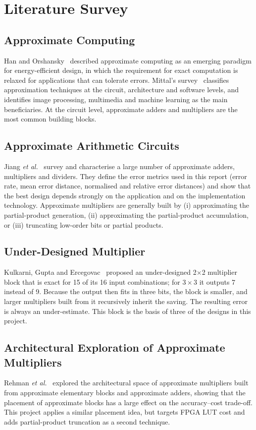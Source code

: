 \documentclass[12pt,a4paper,oneside]{report}
\begin{document}
\chapter{Literature Survey}

\section{Approximate Computing}
Han and Orshansky~\cite{han2013approximate} described approximate computing as an emerging paradigm for energy-efficient design, in which the requirement for exact computation is relaxed for applications that can tolerate errors. Mittal's survey~\cite{mittal2016survey} classifies approximation techniques at the circuit, architecture and software levels, and identifies image processing, multimedia and machine learning as the main beneficiaries. At the circuit level, approximate adders and multipliers are the most common building blocks.

\section{Approximate Arithmetic Circuits}
Jiang \emph{et al.}~\cite{jiang2020survey} survey and characterise a large number of approximate adders, multipliers and dividers. They define the error metrics used in this report (error rate, mean error distance, normalised and relative error distances) and show that the best design depends strongly on the application and on the implementation technology. Approximate multipliers are generally built by (i) approximating the partial-product generation, (ii) approximating the partial-product accumulation, or (iii) truncating low-order bits or partial products.

\section{Under-Designed Multiplier}
Kulkarni, Gupta and Ercegovac~\cite{kulkarni2011udm} proposed an under-designed 2$\times$2 multiplier block that is exact for 15 of its 16 input combinations; for $3\times3$ it outputs 7 instead of 9. Because the output then fits in three bits, the block is smaller, and larger multipliers built from it recursively inherit the saving. The resulting error is always an under-estimate. This block is the basis of three of the designs in this project.

\section{Architectural Exploration of Approximate Multipliers}
Rehman \emph{et al.}~\cite{rehman2016space} explored the architectural space of approximate multipliers built from approximate elementary blocks and approximate adders, showing that the placement of approximate blocks has a large effect on the accuracy--cost trade-off. This project applies a similar placement idea, but targets FPGA LUT cost and adds partial-product truncation as a second technique.
\end{document}
